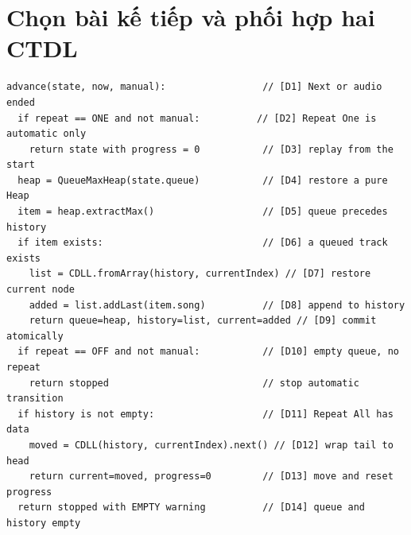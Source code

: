 \documentclass[12pt,a4paper,twoside,openright]{report}
\begin{document}
\section{Chọn bài kế tiếp và phối hợp hai CTDL}
\begin{lstlisting}[style=algorithm]
advance(state, now, manual):                 // [D1] Next or audio ended
  if repeat == ONE and not manual:          // [D2] Repeat One is automatic only
    return state with progress = 0           // [D3] replay from the start
  heap = QueueMaxHeap(state.queue)           // [D4] restore a pure Heap
  item = heap.extractMax()                   // [D5] queue precedes history
  if item exists:                            // [D6] a queued track exists
    list = CDLL.fromArray(history, currentIndex) // [D7] restore current node
    added = list.addLast(item.song)          // [D8] append to history
    return queue=heap, history=list, current=added // [D9] commit atomically
  if repeat == OFF and not manual:           // [D10] empty queue, no repeat
    return stopped                           // stop automatic transition
  if history is not empty:                   // [D11] Repeat All has data
    moved = CDLL(history, currentIndex).next() // [D12] wrap tail to head
    return current=moved, progress=0         // [D13] move and reset progress
  return stopped with EMPTY warning          // [D14] queue and history empty
\end{lstlisting}
\end{document}
